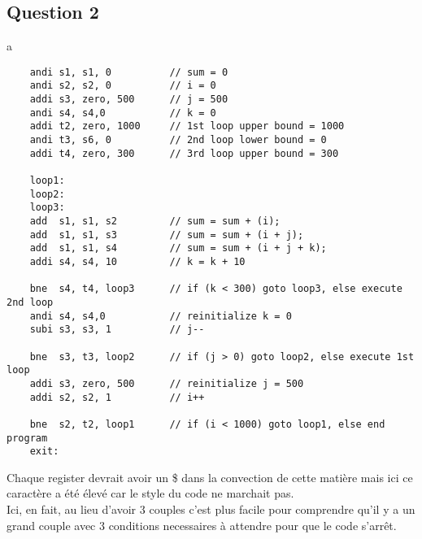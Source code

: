 \documentclass{article}
\begin{document}
\newpage\subsection*{Question 2}
\begin{resolution}
    a
    \begin{scriptsize}
        \myRISCV
        \begin{lstlisting}
    andi s1, s1, 0          // sum = 0
    andi s2, s2, 0          // i = 0
    addi s3, zero, 500      // j = 500
    andi s4, s4,0           // k = 0
    addi t2, zero, 1000     // 1st loop upper bound = 1000
    andi t3, s6, 0          // 2nd loop lower bound = 0
    addi t4, zero, 300      // 3rd loop upper bound = 300

    loop1:
    loop2:
    loop3:
    add  s1, s1, s2         // sum = sum + (i);
    add  s1, s1, s3         // sum = sum + (i + j);
    add  s1, s1, s4         // sum = sum + (i + j + k);
    addi s4, s4, 10         // k = k + 10

    bne  s4, t4, loop3      // if (k < 300) goto loop3, else execute 2nd loop
    andi s4, s4,0           // reinitialize k = 0
    subi s3, s3, 1          // j--

    bne  s3, t3, loop2      // if (j > 0) goto loop2, else execute 1st loop
    addi s3, zero, 500      // reinitialize j = 500
    addi s2, s2, 1          // i++

    bne  s2, t2, loop1      // if (i < 1000) goto loop1, else end program
    exit:
        \end{lstlisting}
    \end{scriptsize}
    Chaque register devrait avoir un \$ dans la convection de cette matière mais ici ce caractère a été élevé car le style du code ne marchait pas.\\
    
    Ici, en fait, au lieu d'avoir 3 couples c'est plus facile pour comprendre qu'il y a un grand couple avec 3 conditions necessaires à attendre pour que le code s'arrêt. 
\end{resolution}
\end{document}
